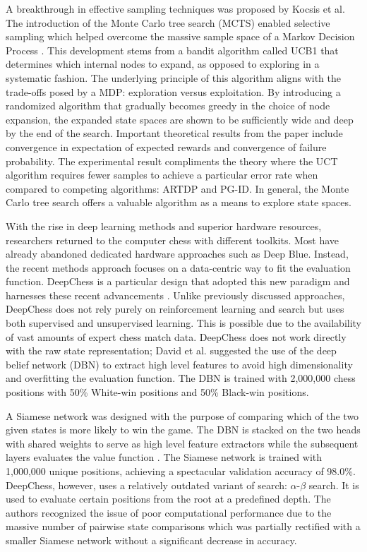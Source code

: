 \documentclass[letterpaper]{article} %
\begin{document}
A breakthrough in effective sampling techniques was proposed by Kocsis et al. The introduction of the Monte Carlo tree search (MCTS) enabled selective sampling which helped overcome the massive sample space of a Markov Decision Process \cite{banditmcts}. This development stems from a bandit algorithm called UCB1 that determines which internal nodes to expand, as opposed to exploring in a systematic fashion. The underlying principle of this algorithm aligns with the trade-offs posed by a MDP: exploration versus exploitation. By introducing a randomized algorithm that gradually becomes greedy in the choice of node expansion, the expanded state spaces are shown to be sufficiently wide and deep by the end of the search. Important theoretical results from the paper include convergence in expectation of expected rewards and convergence of failure probability. The experimental result compliments the theory where the UCT algorithm requires fewer samples to achieve a particular error rate when compared to competing algorithms: ARTDP and PG-ID. In general, the Monte Carlo tree search offers a valuable algorithm as a means to explore state spaces.

With the rise in deep learning methods and superior hardware resources, researchers returned to the computer chess with different toolkits. Most have already abandoned dedicated hardware approaches such as Deep Blue. Instead, the recent methods approach focuses on a data-centric way to fit the evaluation function. DeepChess is a particular design that adopted this new paradigm and harnesses these recent advancements \cite{deepchess}. Unlike previously discussed approaches, DeepChess does not rely purely on reinforcement learning and search but uses both supervised and unsupervised learning. This is possible due to the availability of vast amounts of expert chess match data. DeepChess does not work directly with the raw state representation; David et al. suggested the use of the deep belief network (DBN) to extract high level features to avoid high dimensionality and overfitting the evaluation function. The DBN is trained with 2,000,000 chess positions with 50\% White-win positions and 50\% Black-win positions.

A Siamese network was designed with the purpose of comparing which of the two given states is more likely to win the game. The DBN is stacked on the two heads with shared weights to serve as high level feature extractors while the subsequent layers evaluates the value function \cite{deepchess}. The Siamese network is trained with 1,000,000 unique positions, achieving a spectacular validation accuracy of 98.0\%. DeepChess, however, uses a relatively outdated variant of search: $\alpha$-$\beta$ search. It is used to evaluate certain positions from the root at a predefined depth. The authors recognized the issue of poor computational performance due to the massive number of pairwise state comparisons which was partially rectified with a smaller Siamese network without a significant decrease in accuracy.
\end{document}
